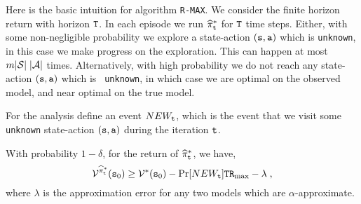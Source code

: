 
Here is the basic intuition for algorithm {\tt R-MAX}. We consider
the finite horizon return with horizon ${\tt T}$.  In each episode
we run $\widehat{\pi}^*_{\tt t}$ for ${\tt T}$ time steps.
Either, with some non-negligible probability we explore a
state-action $({\tt s},{\tt a})$ which is \texttt{unknown}, in this case
we make progress on the exploration.  This can happen at most
$m|\mathcal{S}|\;|\mathcal{A}|$ times. Alternatively, with high probability
we do not reach any state-action $({\tt s},{\tt a})$ which is {\tt
unknown}, in which case we are optimal on the observed model, and
near optimal on the true model.

For the analysis define an event $NEW_{\tt t}$, which is the event that we
visit some \texttt{unknown} state-action $({\tt s},{\tt a})$ during the iteration ${\tt t}$.
\begin{claim}
With probability $1-\delta$, for the return of $\widehat{\pi}^*_{\tt t}$, we have,
\[
\mathcal{V}^{\widehat{\pi}^*_{\tt t}}({\tt s}_0)\geq \mathcal{V}^*({\tt s}_0) -
\Pr[NEW_{\tt t}]{\tt T}{\tt R}_{\max }-\lambda\;,
\]
where $\lambda$ is the approximation error for any two models which are $\alpha$-approximate.
\end{claim}

